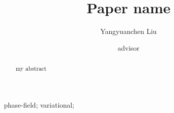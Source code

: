 \begin{frontmatter}
  \title{Paper name}

  \author[1]{Yangyuanchen Liu} \author[1]{advisor}

  \address[1]{Duke University} \address[2]{address 2}

  \begin{abstract}
    my abstract

  \end{abstract}

  \begin{keyword}
    phase-field; variational;
  \end{keyword}
\end{frontmatter}